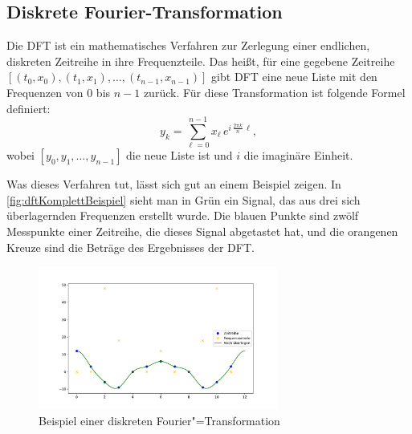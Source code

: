 \subsection{Diskrete Fourier-Transformation}
Die \ac{DFT} ist ein mathematisches Verfahren zur Zerlegung einer endlichen, diskreten Zeitreihe in ihre Frequenzteile. Das heißt, für eine gegebene Zeitreihe $[(t_0,x_0),(t_1,x_1),\ldots,(t_{n-1},x_{n-1})]$ gibt \acs{DFT} eine neue Liste mit den Frequenzen von 0 bis $n-1$ zurück. Für diese Transformation ist folgende Formel definiert:
\[y_k=\sum_{\ell=0}^{n-1}x_\ell\,e^{i\,\tfrac{2\pi k}{n}\,\ell},\]
wobei $[y_0,y_1,\ldots,y_{n-1}]$ die neue Liste ist und $i$ die imaginäre Einheit.

Was dieses Verfahren tut, lässt sich gut an einem Beispiel zeigen. In \autoref{fig:dftKomplettBeispiel} sieht man in Grün ein Signal, das aus drei sich überlagernden Frequenzen erstellt wurde. Die blauen Punkte sind zwölf Messpunkte einer Zeitreihe, die dieses Signal abgetastet hat, und die orangenen Kreuze sind die Beträge des Ergebnisses der \acs{DFT}. 
\begin{figure}[bth] 
  \centering
  \includegraphics[width=0.7\textwidth]{Graphics/DFTExample1.pdf}
  \caption{Beispiel einer diskreten Fourier"=Transformation}
  \label{fig:dftKomplettBeispiel}
\end{figure}

